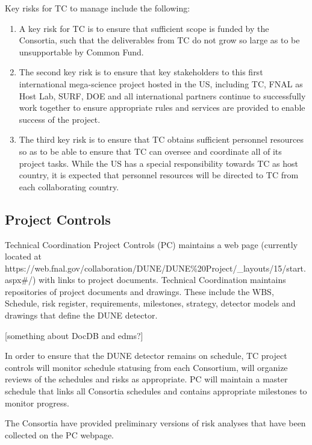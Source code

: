 Key risks for TC to manage include the following:
\begin{enumerate}
  \item A key risk for TC is to ensure that sufficient scope is funded by the
Consortia, such that the deliverables from TC do not grow so large as
to be unsupportable by Common Fund.
  \item The second key risk is to ensure
that key stakeholders to this first international mega-science project
hosted in the US, including TC, FNAL as Host Lab, SURF, DOE and all
international partners continue to successfully work together to
ensure appropriate rules and services are provided to enable success
of the project.
  \item The third key risk is to ensure that TC obtains
sufficient personnel resources so as to be able to ensure that TC can
oversee and coordinate all of its project tasks.  While the US has a
special responsibility towards TC as host country, it is expected that
personnel resources will be directed to TC from each
collaborating country.
\end{enumerate}


\subsection{Project Controls}
\label{sec:fdsp-coord-controls}

Technical Coordination Project Controls (PC) maintains a web page
(currently located at
{https://web.fnal.gov/collaboration/DUNE/DUNE\%20Project/\_layouts/15/start.aspx\#/})
with links to project documents. Technical Coordination maintains
repositories of project documents and drawings. These include the WBS,
Schedule, risk register, requirements, milestones, strategy, detector
models and drawings that define the DUNE detector.

[something about DocDB and edms?]

In order to ensure that the DUNE detector remains on schedule, TC
project controls will monitor schedule statusing from each Consortium,
will organize reviews of the schedules and risks as appropriate. PC
will maintain a master schedule that links all Consortia schedules and
contains appropriate milestones to monitor progress.

The Consortia have provided preliminary versions of risk analyses that
have been collected on the PC webpage.


